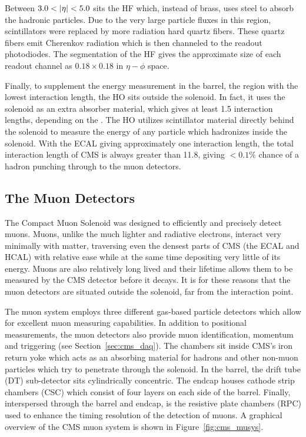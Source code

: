 Between $3.0 < \left|\eta\right| < 5.0$ sits the HF which, instead of brass, uses steel to
absorb the hadronic particles. Due to the very large particle fluxes in this
region, scintillators were replaced by more radiation hard quartz fibers.
These quartz fibers emit Cherenkov radiation which is then channeled to the
readout photodiodes. The segmentation of the HF gives the approximate size
of each readout channel as $0.18 \times 0.18$ in $\eta - \phi$ space.

Finally, to supplement the energy measurement in the barrel, the region with
the lowest interaction length, the HO sits outside the solenoid. In fact,
it uses the solenoid as an extra absorber material, which gives at least
1.5 interaction lengths, depending on the \pr. The HO utilizes scintillator
material directly behind the solenoid to measure the energy of any particle
which hadronizes inside the solenoid. With the ECAL giving approximately one
interaction length, the total interaction length of CMS is always greater
than 11.8, giving $< 0.1\%$ chance of a hadron punching through to the muon
detectors.

\subsection{The Muon Detectors}
\label {sec:cms_musys}
The Compact Muon Solenoid was designed to efficiently and precisely detect
muons. Muons, unlike the much lighter and radiative electrons, interact very
minimally with matter, traversing even the densest parts of CMS (the ECAL and
HCAL) with relative ease while at the same time depositing very little of its
energy. Muons are also relatively long lived and their lifetime allows them to
be measured by the CMS detector before it decays. It is for these reasons that
the muon detectors are situated outside the solenoid, far from the interaction
point.

The muon system employs three different gas-based particle detectors which
allow for excellent muon measuring capabilities. In addition to positional
measurements, the muon detectors also provide muon identification, momentum
and triggering (see Section~\ref{sec:cms_daq}). The chambers sit inside CMS's
iron return yoke which acts as an absorbing material for hadrons and other
non-muon particles which try to penetrate through the solenoid. In the barrel,
the drift tube (DT) sub-detector sits cylindrically concentric. The endcap
houses cathode strip chambers (CSC) which consist of four layers on each side
of the barrel. Finally, interspersed through the barrel and endcap, is the
resistive plate chambers (RPC) used to enhance the timing resolution of the
detection of muons. A graphical overview of the CMS muon system is shown in
Figure~\ref{fig:cms_musys}.

